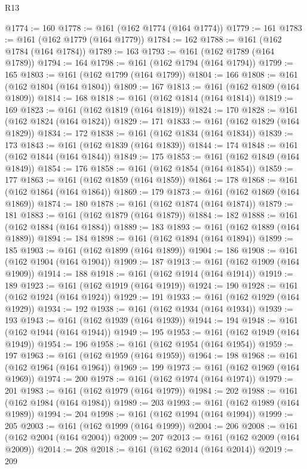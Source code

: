 \begin{lexlean}{R13}
\begin{coremodule}
{{{{{{{{{{{{{{{{{{{{{{{{{{{{{{{{{{{{{{{{{{{{{{{{{{{{{{{{{{{{{{{{{{{{{{{{{{{{{{{{{{{{{{{{{{{{{{{{{{{{{{{{{{@1774 := 160
@1778 := @161 (@162 @1774 (@164 @1774))
@1779 := 161
@1783 := @161 (@162 @1779 (@164 @1779))
@1784 := 162
@1788 := @161 (@162 @1784 (@164 @1784))
@1789 := 163
@1793 := @161 (@162 @1789 (@164 @1789))
@1794 := 164
@1798 := @161 (@162 @1794 (@164 @1794))
@1799 := 165
@1803 := @161 (@162 @1799 (@164 @1799))
@1804 := 166
@1808 := @161 (@162 @1804 (@164 @1804))
@1809 := 167
@1813 := @161 (@162 @1809 (@164 @1809))
@1814 := 168
@1818 := @161 (@162 @1814 (@164 @1814))
@1819 := 169
@1823 := @161 (@162 @1819 (@164 @1819))
@1824 := 170
@1828 := @161 (@162 @1824 (@164 @1824))
@1829 := 171
@1833 := @161 (@162 @1829 (@164 @1829))
@1834 := 172
@1838 := @161 (@162 @1834 (@164 @1834))
@1839 := 173
@1843 := @161 (@162 @1839 (@164 @1839))
@1844 := 174
@1848 := @161 (@162 @1844 (@164 @1844))
@1849 := 175
@1853 := @161 (@162 @1849 (@164 @1849))
@1854 := 176
@1858 := @161 (@162 @1854 (@164 @1854))
@1859 := 177
@1863 := @161 (@162 @1859 (@164 @1859))
@1864 := 178
@1868 := @161 (@162 @1864 (@164 @1864))
@1869 := 179
@1873 := @161 (@162 @1869 (@164 @1869))
@1874 := 180
@1878 := @161 (@162 @1874 (@164 @1874))
@1879 := 181
@1883 := @161 (@162 @1879 (@164 @1879))
@1884 := 182
@1888 := @161 (@162 @1884 (@164 @1884))
@1889 := 183
@1893 := @161 (@162 @1889 (@164 @1889))
@1894 := 184
@1898 := @161 (@162 @1894 (@164 @1894))
@1899 := 185
@1903 := @161 (@162 @1899 (@164 @1899))
@1904 := 186
@1908 := @161 (@162 @1904 (@164 @1904))
@1909 := 187
@1913 := @161 (@162 @1909 (@164 @1909))
@1914 := 188
@1918 := @161 (@162 @1914 (@164 @1914))
@1919 := 189
@1923 := @161 (@162 @1919 (@164 @1919))
@1924 := 190
@1928 := @161 (@162 @1924 (@164 @1924))
@1929 := 191
@1933 := @161 (@162 @1929 (@164 @1929))
@1934 := 192
@1938 := @161 (@162 @1934 (@164 @1934))
@1939 := 193
@1943 := @161 (@162 @1939 (@164 @1939))
@1944 := 194
@1948 := @161 (@162 @1944 (@164 @1944))
@1949 := 195
@1953 := @161 (@162 @1949 (@164 @1949))
@1954 := 196
@1958 := @161 (@162 @1954 (@164 @1954))
@1959 := 197
@1963 := @161 (@162 @1959 (@164 @1959))
@1964 := 198
@1968 := @161 (@162 @1964 (@164 @1964))
@1969 := 199
@1973 := @161 (@162 @1969 (@164 @1969))
@1974 := 200
@1978 := @161 (@162 @1974 (@164 @1974))
@1979 := 201
@1983 := @161 (@162 @1979 (@164 @1979))
@1984 := 202
@1988 := @161 (@162 @1984 (@164 @1984))
@1989 := 203
@1993 := @161 (@162 @1989 (@164 @1989))
@1994 := 204
@1998 := @161 (@162 @1994 (@164 @1994))
@1999 := 205
@2003 := @161 (@162 @1999 (@164 @1999))
@2004 := 206
@2008 := @161 (@162 @2004 (@164 @2004))
@2009 := 207
@2013 := @161 (@162 @2009 (@164 @2009))
@2014 := 208
@2018 := @161 (@162 @2014 (@164 @2014))
@2019 := 209
}}}}}}}}}}}}}}}}}}}}}}}}}}}}}}}}}}}}}}}}}}}}}}}}}}}}}}}}}}}}}}}}}}}}}}}}}}}}}}}}}}}}}}}}}}}}}}}}}}}}}}}}}}
\end{coremodule}
\end{lexlean}

